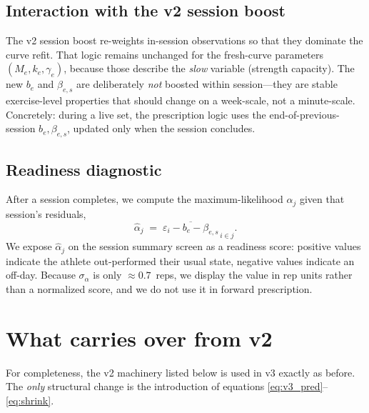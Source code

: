 \documentclass[11pt]{article}
\begin{document}
\subsection{Interaction with the v2 session boost}
The v2 session boost re-weights in-session observations so that they dominate the curve refit.
That logic remains unchanged for the fresh-curve parameters $(M_e, k_e, \gamma_e)$, because those describe the \emph{slow} variable (strength capacity).
The new $b_e$ and $\beta_{e,s}$ are deliberately \emph{not} boosted within session---they are stable exercise-level properties that should change on a week-scale, not a minute-scale.
Concretely: during a live set, the prescription logic uses the end-of-previous-session $b_e, \beta_{e,s}$, updated only when the session concludes.

\subsection{Readiness diagnostic}
After a session completes, we compute the maximum-likelihood $\alpha_j$ given that session's residuals,
\begin{equation}
\hat\alpha_j \;=\; \overline{\varepsilon_i - b_e - \beta_{e,s}}_{\,i \in j}.
\end{equation}
We expose $\hat\alpha_j$ on the session summary screen as a readiness score: positive values indicate the athlete out-performed their usual state, negative values indicate an off-day.
Because $\sigma_\alpha$ is only $\approx 0.7$~reps, we display the value in rep units rather than a normalized score, and we do not use it in forward prescription.

\section{What carries over from v2}
\label{sec:v2recap}

For completeness, the v2 machinery listed below is used in v3 exactly as before.
The \emph{only} structural change is the introduction of equations \eqref{eq:v3_pred}--\eqref{eq:shrink}.
\end{document}
